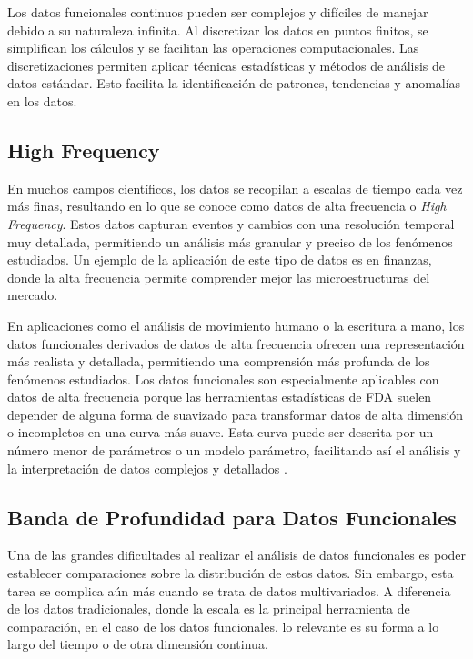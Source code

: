 Los datos funcionales continuos pueden ser complejos y difíciles de manejar debido a su naturaleza infinita. Al discretizar los datos en puntos finitos, se simplifican los cálculos y se facilitan las operaciones computacionales. Las discretizaciones permiten aplicar técnicas estadísticas y métodos de análisis de datos estándar. Esto facilita la identificación de patrones, tendencias y anomalías en los datos.

\subsection{High Frequency}

En muchos campos científicos, los datos se recopilan a escalas de tiempo cada vez más finas, resultando en lo que se conoce como datos de alta frecuencia o \textit{High Frequency}. Estos datos capturan eventos y cambios con una resolución temporal muy detallada, permitiendo un análisis más granular y preciso de los fenómenos estudiados. Un ejemplo de la aplicación de este tipo de datos es en finanzas, donde la alta frecuencia permite comprender mejor las microestructuras del mercado. \cite{Tsay2000}

 En aplicaciones como el análisis de movimiento humano o la escritura a mano, los datos funcionales derivados de datos de alta frecuencia ofrecen una representación más realista y detallada, permitiendo una comprensión más profunda de los fenómenos estudiados. Los datos funcionales son especialmente aplicables con datos de alta frecuencia porque las herramientas estadísticas de FDA suelen depender de alguna forma de suavizado para transformar datos de alta dimensión o incompletos en una curva más suave. Esta curva puede ser descrita por un número menor de parámetros o un modelo parámetro, facilitando así el análisis y la interpretación de datos complejos y detallados \cite{Miao2013}.

 

\subsection{Banda de Profundidad para Datos Funcionales}

Una de las grandes dificultades al realizar el análisis de datos funcionales es poder establecer comparaciones sobre la distribución de estos datos. Sin embargo, esta tarea se complica aún más cuando se trata de datos multivariados. A diferencia de los datos tradicionales, donde la escala es la principal herramienta de comparación, en el caso de los datos funcionales, lo relevante es su forma a lo largo del tiempo o de otra dimensión continua.

